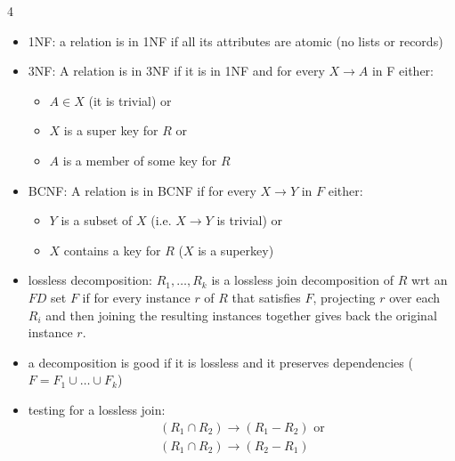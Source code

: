 \documentclass[8pt,landscape]{article}
\begin{document}
\begin{multicols*}{4}
\begin{itemize}[leftmargin=*]
    \begin{center}
\begin{minipage}{\linewidth}
\begin{algorithmic}[1]
\State $\text{closure} \gets X$
\State Mark all FDs $U \to V$ in $F$ as \textit{unused}
\Repeat
        \State Add $V$ to $\text{closure}$ and mark $U \to V$ as \textit{used}
    \EndIf
{}
\end{algorithmic}
\end{minipage}
\end{center}
\item 1NF: a relation is in 1NF if all its attributes are atomic (no lists or records)
\item 3NF: A relation is in 3NF if it is in 1NF and for every \(X\rightarrow A\) in F either:
  \begin{itemize}
    \item \(A\in X\) (it is trivial) or
    \item \(X\) is a super key for \(R\) or
    \item \(A\) is a member of some key for \(R\)
    \end{itemize}
  \item BCNF: A relation is in BCNF if for every \(X\rightarrow Y\) in \(F\) either:
    \begin{itemize}
      \item \(Y\) is a subset of \(X\) (i.e. \(X\rightarrow Y\) is trivial) or
      \item \(X\) contains a key for \(R\) (\(X\) is a superkey)
      \end{itemize}
    \item lossless decomposition: \(R_1,\dots,R_{k}\) is a lossless join decomposition of \(R\) wrt an \(FD\) set \(F\) if for every instance \(r\) of \(R\) that satisfies \(F\), projecting \(r\) over each \(R_{i}\) and then joining the resulting instances together gives back the original instance \(r\).
    \item a decomposition is good if it is lossless and it preserves dependencies (\(F=F_1\cup\dots\cup F_k\))
    \item testing for a lossless join: 
      \begin{align*}
        (R_1 \cap R_2)\rightarrow(R_1-R_2)\text{ or}\\
        (R_1 \cap R_2)\rightarrow(R_2-R_1)
      \end{align*}

\end{itemize}
\end{multicols*}
\end{document}
